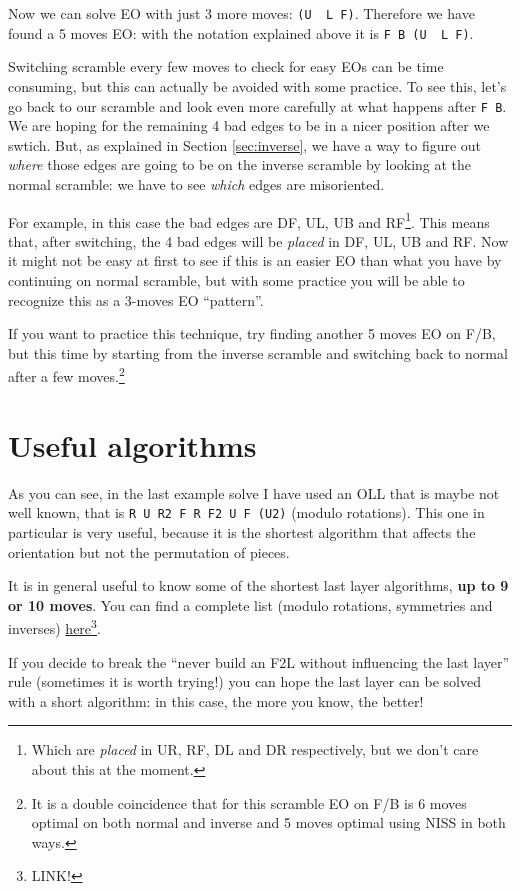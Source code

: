 \documentclass[11pt,a4paper]{book}
\newcommand{\p}{\textquotesingle}
\newcommand{\m}{\texttt}
\newcommand{\ps}{\p\,\,}
\begin{document}
Now we can solve EO with just 3 more moves: \m{(U\ps L F)}. Therefore we have found a 5 moves EO: with the notation explained above it is \m{F B (U\ps L F)}.

Switching scramble every few moves to check for easy EOs can be time consuming, but this can actually be avoided with some practice. To see this, let's go back to our scramble and look even more carefully at what happens after \m{F B}. We are hoping for the remaining 4 bad edges to be in a nicer position after we swtich. But, as explained in Section \ref{sec:inverse}, we have a way to figure out \emph{where} those edges are going to be on the inverse scramble by looking at the normal scramble: we have to see \emph{which} edges are misoriented.

For example, in this case the bad edges are DF, UL, UB and RF\footnote{Which are \emph{placed} in UR, RF, DL and DR respectively, but we don't care about this at the moment.}. This means that, after switching, the 4 bad edges will be \emph{placed} in DF, UL, UB and RF. Now it might not be easy at first to see if this is an easier EO than what you have by continuing on normal scramble, but with some practice you will be able to recognize this as a 3-moves EO ``pattern''.

If you want to practice this technique, try finding another 5 moves EO on F/B, but this time by starting from the inverse scramble and switching back to normal after a few moves.\footnote{It is a double coincidence that for this scramble EO on F/B is 6 moves optimal on both normal and inverse and 5 moves optimal using NISS in both ways.}


\section{Useful algorithms}

As you can see, in the last example solve I have used an OLL that is maybe not well known, that is \m{R U R2 F R F2 U F (U2)} (modulo rotations). This one in particular is very useful, because it is the shortest algorithm that affects the orientation but not the permutation of pieces.

It is in general useful to know some of the shortest last layer algorithms, \textbf{up to 9 or 10 moves}. You can find a complete list (modulo rotations, symmetries and inverses) \href{missinglink}{here}\footnote{{\color{red}LINK!}}.

If you decide to break the ``never build an F2L without influencing the last layer'' rule (sometimes it is worth trying!) you can hope the last layer can be solved with a short algorithm: in this case, the more you know, the better!
\end{document}
